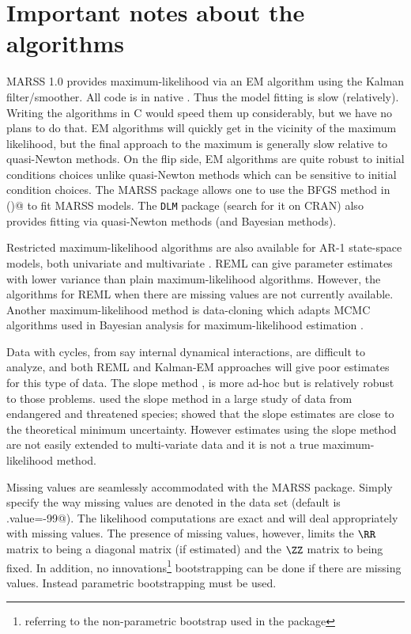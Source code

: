 \section{Important notes about the algorithms}

MARSS 1.0 provides maximum-likelihood via an EM algorithm using the Kalman filter/smoother.  All code is in native \R.  Thus the model fitting is slow (relatively).  Writing the algorithms in C would speed them up considerably, but we have no plans to do that.  EM algorithms will quickly get in the vicinity of the maximum likelihood, but the final approach to the maximum is generally slow relative to quasi-Newton methods.  On the flip side, EM algorithms are quite robust to initial conditions choices unlike quasi-Newton methods which can be sensitive to initial condition choices.  The MARSS package allows one to use the BFGS method in \verb@optim()@ to fit MARSS models. The \texttt{DLM} package (search for it on CRAN) also provides fitting via quasi-Newton methods (and Bayesian methods).

Restricted maximum-likelihood algorithms are also available for AR-1 state-space models, both univariate \citep{Staplesetal2004} and multivariate \citep{Hinrichsen2009}.  REML can give parameter estimates with lower variance than plain maximum-likelihood algorithms.  However, the algorithms for REML when there are missing values are not currently available.  Another maximum-likelihood method is data-cloning which adapts MCMC algorithms used in Bayesian analysis for maximum-likelihood estimation \citep{Leleetal2007}.  

Data with cycles, from say internal dynamical interactions, are difficult to analyze, and both REML and Kalman-EM approaches will give poor estimates for this type of data.  The slope method \citep{Holmes2001}, is more ad-hoc but is relatively robust to those problems.  \citet{Holmesetal2007} used the slope method in a large study of data from endangered and threatened species; \citet{EllnerHolmes2008}  showed that the slope estimates are close to the theoretical minimum uncertainty.  However estimates using the slope method are not easily extended to multi-variate data and it is not a true maximum-likelihood method. 

Missing values are seamlessly accommodated with the MARSS package.  Simply specify the way missing values are denoted in the data set (default is \verb@miss.value=-99@).  The likelihood computations are exact and will deal appropriately with missing values.  The presence of missing values, however, limits the $\RR$ matrix to being a diagonal matrix (if estimated) and the $\ZZ$ matrix to being fixed.  In addition, no innovations\footnote{referring to the non-parametric bootstrap used in the package} bootstrapping can be done if there are missing values.  Instead parametric bootstrapping must be used.

